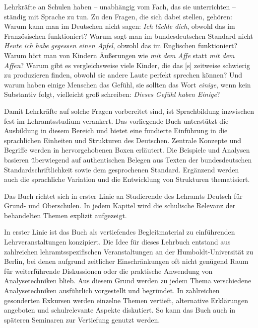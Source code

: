 \begin{refsection}

Lehrkräfte an Schulen haben – unabhängig vom Fach, das sie unterrichten – ständig mit Sprache zu tun. Zu den Fragen, die sich dabei stellen, gehören: Warum kann man im Deutschen nicht sagen: \textit{Ich lächle dich}, obwohl das im Französischen funktioniert? Warum sagt man im bundesdeutschen Standard nicht \textit{Heute ich habe gegessen einen Apfel}, obwohl das im Englischen funktioniert? Warum hört man von Kindern Äußerungen wie \textit{mit dem Affe} statt \textit{mit dem Affen}? Warum gibt es vergleichsweise viele Kinder, die das [s] zeitweise schwierig zu produzieren finden, obwohl sie andere Laute perfekt sprechen können? Und warum haben einige Menschen das Gefühl, sie sollten das Wort \textit{einige}, wenn kein Substantiv folgt, vielleicht groß schreiben: \textit{Dieses Gefühl haben Einige}? 

Damit Lehrkräfte auf solche Fragen vorbereitet sind, ist Sprachbildung inzwischen fest im Lehramtsstudium verankert. Das vorliegende Buch unterstützt die Ausbildung in diesem Bereich und bietet eine fundierte Einführung in die sprachlichen Einheiten und Strukturen des Deutschen. Zentrale Konzepte und Begriffe werden in hervorgehobenen Boxen erläutert. Die Beispiele und Analysen basieren überwiegend auf authentischen Belegen aus Texten der bundesdeutschen Standardschriftlichkeit sowie dem gesprochenen Standard. Ergänzend werden auch die sprachliche Variation und die Entwicklung von Strukturen thematisiert.     

Das Buch richtet sich in erster Linie an Studierende des Lehramts Deutsch für Grund- und Oberschulen. In jedem Kapitel wird die schulische Relevanz der behandelten Themen explizit aufgezeigt. 

In erster Linie ist das Buch als vertiefendes Begleitmaterial zu einführenden Lehrveranstaltungen konzipiert. Die Idee für dieses Lehrbuch entstand aus zahlreichen lehramtsspezifischen Veranstaltungen an der Humboldt-Universität zu Berlin, bei denen aufgrund zeitlicher Einschränkungen oft nicht genügend Raum für weiterführende Diskussionen oder die praktische Anwendung von Analysetechniken blieb. Aus diesem Grund werden zu jedem Thema verschiedene Analysetechniken ausführlich vorgestellt und begründet. In zahlreichen gesonderten Exkursen werden einzelne Themen vertieft, alternative Erklärungen angeboten und schulrelevante Aspekte diskutiert. So kann das Buch auch in späteren Seminaren zur Vertiefung genutzt werden.    


\end{refsection}
